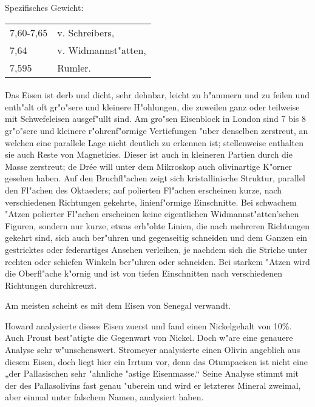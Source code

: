 \documentclass[a4paper, 11pt, oneside]{article}
\begin{document}
Spezifisches Gewicht:  
\begin{table}[!ht]
    \centering
    \begin{tabular}{l l}
        7,60-7,65 & v. Schreibers,\\
        7,64 & v. Widmannst"atten,\\
        7,595 & Rumler.
    \end{tabular}
\end{table}
\paragraph{}
Das Eisen ist derb und dicht, sehr dehnbar, leicht zu h"ammern und zu feilen und enth"alt oft gr"o"sere und kleinere H"ohlungen, die zuweilen ganz oder teilweise mit Schwefeleisen ausgef"ullt sind. Am gro"sen Eisenblock in London sind 7 bis 8 gr"o"sere und kleinere r"ohrenf"ormige Vertiefungen "uber denselben zerstreut, an welchen eine parallele Lage nicht deutlich zu erkennen ist; stellenweise enthalten sie auch Reste von Magnetkies. Dieser ist auch in kleineren Partien durch die Masse zerstreut; de Drée will unter dem Mikroskop auch olivinartige K"orner gesehen haben. Auf den Bruchfl"achen zeigt sich kristallinische Struktur, parallel den Fl"achen des Oktaeders; auf polierten Fl"achen erscheinen kurze, nach verschiedenen Richtungen gekehrte, linienf"ormige Einschnitte. Bei schwachem "Atzen polierter Fl"achen erscheinen keine eigentlichen Widmannst"atten'schen Figuren, sondern nur kurze, etwas erh"ohte Linien, die nach mehreren Richtungen gekehrt sind, sich auch ber"uhren und gegenseitig schneiden und dem Ganzen ein gestricktes oder federartiges Ansehen verleihen, je nachdem sich die Striche unter rechten oder schiefen Winkeln ber"uhren oder schneiden. Bei starkem "Atzen wird die Oberfl"ache k"ornig und ist von tiefen Einschnitten nach verschiedenen Richtungen durchkreuzt.

Am meisten scheint es mit dem Eisen von Senegal verwandt.

Howard analysierte dieses Eisen zuerst und fand einen Nickelgehalt von 10\%. Auch Proust best"atigte die Gegenwart von Nickel. Doch w"are eine genauere Analyse sehr w"unschenswert. Stromeyer analysierte einen Olivin angeblich aus diesem Eisen, doch liegt hier ein Irrtum vor, denn das Otumpaeisen ist nicht eine „der Pallasischen sehr "ahnliche "astige Eisenmasse.“ Seine Analyse stimmt mit der des Pallasolivins fast genau "uberein und wird er letzteres Mineral zweimal, aber einmal unter falschem Namen, analysiert haben.
\end{document}
